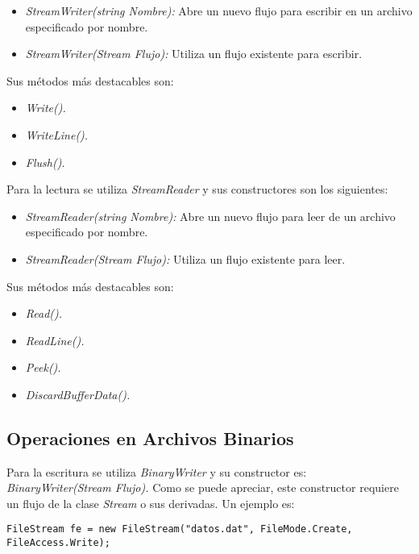 \documentclass[letterpaper, 12pt]{article}
\begin{document}
\begin{justify}
        \begin{itemize}
            \item \emph{StreamWriter(string Nombre):} Abre un nuevo flujo para escribir en un archivo especificado por nombre.
            \item \emph{StreamWriter(Stream Flujo):} Utiliza un flujo existente para escribir.
        \end{itemize}
        Sus métodos más destacables son:
        \begin{itemize}
            \item \emph{Write().}
            \item \emph{WriteLine().}
            \item \emph{Flush().}
        \end{itemize}
        Para la lectura se utiliza \emph{StreamReader} y sus constructores son los siguientes:
        \begin{itemize}
            \item \emph{StreamReader(string Nombre):} Abre un nuevo flujo para leer de un archivo especificado por nombre.
            \item \emph{StreamReader(Stream Flujo):} Utiliza un flujo existente para leer.
        \end{itemize}
        Sus métodos más destacables son:
        \begin{itemize}
            \item \emph{Read().}
            \item \emph{ReadLine().}
            \item \emph{Peek().}
            \item \emph{DiscardBufferData().}
        \end{itemize}
        \subsection{Operaciones en Archivos Binarios}
        Para la escritura se utiliza \emph{BinaryWriter} y su constructor es: \emph{BinaryWriter(Stream Flujo).} Como se puede apreciar, este constructor requiere un flujo de la clase
        \emph{Stream} o sus derivadas. Un ejemplo es:
        \begin{verbatim}
FileStream fe = new FileStream("datos.dat", FileMode.Create, FileAccess.Write);


\end{verbatim}
\end{justify}
\end{document}
